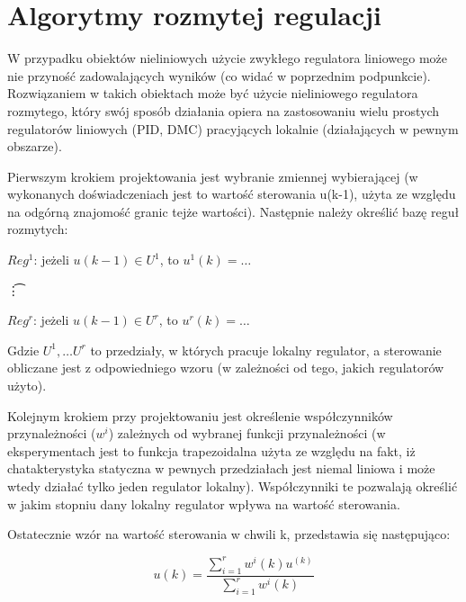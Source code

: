 \chapter{Algorytmy rozmytej regulacji}

W przypadku obiektów nieliniowych użycie zwykłego regulatora liniowego może nie przyność zadowalających wyników (co widać w poprzednim podpunkcie). Rozwiązaniem w takich obiektach może być użycie nieliniowego regulatora rozmytego, który swój sposób działania opiera na zastosowaniu wielu prostych regulatorów liniowych (PID, DMC) pracyjących lokalnie (działających w pewnym obszarze).

Pierwszym krokiem projektowania jest wybranie zmiennej wybierającej (w wykonanych doświadczeniach jest to wartość sterowania u(k-1), użyta ze względu na odgórną znajomość granic tejże wartości). Następnie należy określić bazę reguł rozmytych:

$Reg^1$: jeżeli $u(k-1)\in U^1$, to $u^1(k)= \dots$ 


\t\vdots 


$Reg^r$: jeżeli $u(k-1)\in U^r$, to $u^r(k)= \dots$ 


Gdzie $U^1, \dots U^r$ to przedziały, w których pracuje lokalny regulator, a sterowanie obliczane jest z odpowiedniego wzoru (w zależności od tego, jakich regulatorów użyto).

Kolejnym krokiem przy projektowaniu jest określenie współczynników przynależności ($w^i$) zależnych od wybranej funkcji przynależności (w eksperymentach jest to funkcja trapezoidalna użyta ze względu na fakt, iż chatakterystyka statyczna w pewnych przedziałach jest niemal liniowa i może wtedy działać tylko jeden regulator lokalny). Współczynniki te pozwalają określić w jakim stopniu dany lokalny regulator wpływa na wartość sterowania.

Ostatecznie wzór na wartość sterowania w chwili k, przedstawia się następująco:

\begin{equation}
u(k)= \frac{\sum_{i=1}^{r}w^i(k)u^(k)}{\sum_{i=1}^{r}w^i(k)}
\end{equation}

